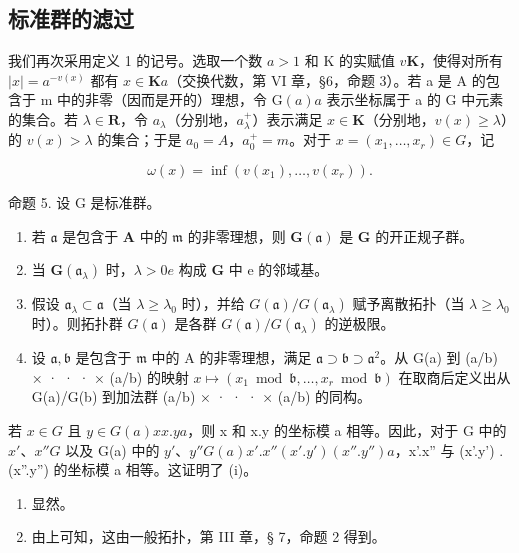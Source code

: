 \subsection{标准群的滤过}

我们再次采用定义 1 的记号。选取一个数 \(a > 1\) 和 K 的实赋值 \(v\)\(\mathbf{K}\)，使得对所有 \(|x| = a^{-v(x)}\) 都有 \(x \in \mathbf{K}\)\(a\)（交换代数，第 VI 章，§6，命题 3）。若 a 是 A 的包含于 m 中的非零（因而是开的）理想，令 \(\mathrm{G}(a)\)\(a\) 表示坐标属于 a 的 G 中元素的集合。若 \(\lambda \in \mathbf{R}\)，令 \(a_{\lambda}\)（分别地，\(a_{\lambda}^{+}\)）表示满足 \(x \in \mathbf{K}\)（分别地，\(v(x) \geqslant \lambda\)）的 \(v(x) > \lambda\) 的集合；于是 \(a_0 = A\)，\(a_0^+ = m\)。对于 \(x = (x_1, \ldots, x_r) \in G\)，记

\[
\omega (x) = \inf (v (x _ {1}), \dots , v (x _ {r})).\tag{5}
\]

命题 5. 设 G 是标准群。

\begin{enumerate}
\def\labelenumi{(\roman{enumi})}
\item
  若 \(\mathfrak{a}\) 是包含于 \(\mathbf{A}\) 中的 \(\mathfrak{m}\) 的非零理想，则 \(\mathbf{G}(\mathfrak{a})\) 是 \(\mathbf{G}\) 的开正规子群。
\item
  当 \(\mathbf{G}(\mathfrak{a}_{\lambda})\) 时，\(\lambda > 0\)\(e\) 构成 \(\mathbf{G}\) 中 e 的邻域基。
\item
  假设 \(\mathfrak{a}_{\lambda} \subset \mathfrak{a}\)（当 \(\lambda \geqslant \lambda_0\) 时），并给 \(G(\mathfrak{a}) / G(\mathfrak{a}_{\lambda})\) 赋予离散拓扑（当 \(\lambda \geqslant \lambda_0\) 时）。则拓扑群 \(G(\mathfrak{a})\) 是各群 \(G(\mathfrak{a}) / G(\mathfrak{a}_{\lambda})\) 的逆极限。
\item
  设 \(\mathfrak{a},\mathfrak{b}\) 是包含于 \(\mathfrak{m}\) 中的 A 的非零理想，满足 \(\mathfrak{a} \supset \mathfrak{b} \supset \mathfrak{a}^2\)。从 G(a) 到 (a/b) × · · · × (a/b) 的映射 \(x \mapsto (x_1 \bmod \mathfrak{b}, \ldots, x_r \bmod \mathfrak{b})\) 在取商后定义出从 G(a)/G(b) 到加法群 (a/b) × · · · × (a/b) 的同构。
\end{enumerate}

若 \(x \in G\) 且 \(y \in G(a)\)\(x\)\(x.y\)\(a\)，则 x 和 x.y 的坐标模 a 相等。因此，对于 G 中的 \(x'\)、\(x''\)\(G\) 以及 G(a) 中的 \(y'\)、\(y''\)\(G(a)\)\(x'.x''\)\((x'.y')\)\((x''.y'')\)\(a\)，x'.x'' 与 (x'.y') . (x''.y'') 的坐标模 a 相等。这证明了 (i)。

\begin{enumerate}
\def\labelenumi{(\roman{enumi})}
\setcounter{enumi}{1}
\item
  显然。
\item
  由上可知，这由一般拓扑，第 III 章，§ 7，命题 2 得到。
\end{enumerate}

